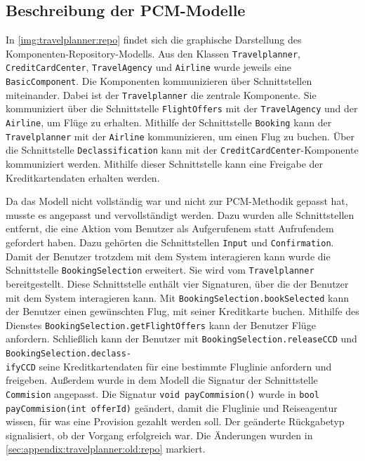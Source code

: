 \subsection{Beschreibung der PCM-Modelle}
\label{sec:travelplanner:pcm}
In \autoref{img:travelplanner:repo} findet sich die graphische Darstellung des Komponenten-Repository-Modells. Aus den Klassen \texttt{Travelplanner}, \texttt{CreditCardCenter}, \texttt{TravelAgency} und \texttt{Airline} wurde jeweils eine \texttt{BasicComponent}. Die Komponenten kommunizieren über Schnittstellen miteinander. Dabei ist der \texttt{Travelplanner} die zentrale Komponente. Sie kommuniziert über die Schnittstelle \texttt{FlightOffers} mit der \texttt{TravelAgency} und der \texttt{Airline}, um Flüge zu erhalten. Mithilfe der Schnittstelle \texttt{Booking} kann der \texttt{Travelplanner} mit der \texttt{Airline} kommunizieren, um einen Flug zu buchen. Über die Schnittstelle \texttt{Declassification} kann mit der \texttt{CreditCardCenter}-Komponente kommuniziert werden. Mithilfe dieser Schnittstelle kann eine Freigabe der Kreditkartendaten erhalten werden. \par 
Da das Modell nicht vollständig war und nicht zur PCM-Methodik gepasst hat, musste es angepasst und vervollständigt werden. Dazu wurden alle Schnittstellen entfernt, die eine Aktion vom Benutzer als Aufgerufenem statt Aufrufendem gefordert haben. Dazu gehörten die Schnittstellen \texttt{Input} und \texttt{Confirmation}. Damit der Benutzer trotzdem mit dem System interagieren kann wurde die Schnittstelle \texttt{BookingSelection} erweitert. Sie wird vom \texttt{Travelplanner} bereitgestellt. Diese Schnittstelle enthält vier Signaturen, über die der Benutzer mit dem System interagieren kann. Mit \texttt{BookingSelection.bookSelected} kann der Benutzer einen gewünschten Flug, mit seiner Kreditkarte buchen. Mithilfe des Dienstes \texttt{BookingSelection.getFlightOffers} kann der Benutzer Flüge anfordern. Schließlich kann der Benutzer mit \texttt{BookingSelection.releaseCCD} und \texttt{BookingSelection.declass-\\ifyCCD} seine Kreditkartendaten für eine bestimmte Fluglinie anfordern und freigeben. Außerdem wurde in dem Modell die Signatur der Schnittstelle \texttt{Commision} angepasst. Die Signatur \texttt{void payCommision()} wurde in \texttt{bool payCommision(int offerId)} geändert, damit die Fluglinie und Reiseagentur wissen, für was eine Provision gezahlt werden soll. Der geänderte Rückgabetyp signalisiert, ob der Vorgang erfolgreich war. Die Änderungen wurden in \autoref{sec:appendix:travelplanner:old:repo} markiert. \par
